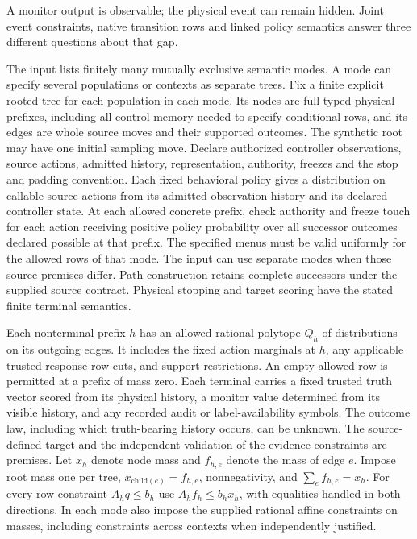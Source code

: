 A monitor output is observable; the physical event can remain hidden. Joint event constraints, native transition rows and linked policy semantics answer three different questions about that gap.

The input lists finitely many mutually exclusive semantic modes. A mode can specify several populations or contexts as separate trees. Fix a finite explicit rooted tree for each population in each mode. Its nodes are full typed physical prefixes, including all control memory needed to specify conditional rows, and its edges are whole source moves and their supported outcomes. The synthetic root may have one initial sampling move. Declare authorized controller observations, source actions, admitted history, representation, authority, freezes and the stop and padding convention. Each fixed behavioral policy gives a distribution on callable source actions from its admitted observation history and its declared controller state. At each allowed concrete prefix, check authority and freeze touch for each action receiving positive policy probability over all successor outcomes declared possible at that prefix. The specified menus must be valid uniformly for the allowed rows of that mode. The input can use separate modes when those source premises differ. Path construction retains complete successors under the supplied source contract. Physical stopping and target scoring have the stated finite terminal semantics.

Each nonterminal prefix \(h\) has an allowed rational polytope \(Q_h\) of distributions on its outgoing edges. It includes the fixed action marginals at \(h\), any applicable trusted response-row cuts, and support restrictions. An empty allowed row is permitted at a prefix of mass zero. Each terminal carries a fixed trusted truth vector scored from its physical history, a monitor value determined from its visible history, and any recorded audit or label-availability symbols. The outcome law, including which truth-bearing history occurs, can be unknown. The source-defined target and the independent validation of the evidence constraints are premises. Let \(x_h\) denote node mass and \(f_{h,e}\) denote the mass of edge \(e\). Impose root mass one per tree, \(x_{\mathrm{child}(e)}=f_{h,e}\), nonnegativity, and \(\sum_e f_{h,e}=x_h\). For every row constraint \(A_hq\le b_h\) use \(A_h f_h\le b_h x_h\), with equalities handled in both directions. In each mode also impose the supplied rational affine constraints on masses, including constraints across contexts when independently justified.

